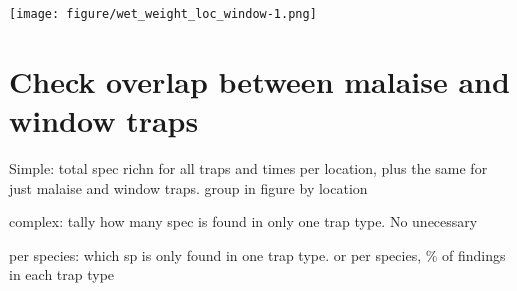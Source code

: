 \documentclass[]{article}
\newenvironment{Shaded}{\begin{snugshade}}{\end{snugshade}}
\newcommand{\DataTypeTok}[1]{\textcolor[rgb]{0.13,0.29,0.53}{#1}}
\newcommand{\DecValTok}[1]{\textcolor[rgb]{0.00,0.00,0.81}{#1}}
\newcommand{\FloatTok}[1]{\textcolor[rgb]{0.00,0.00,0.81}{#1}}
\newcommand{\KeywordTok}[1]{\textcolor[rgb]{0.13,0.29,0.53}{\textbf{#1}}}
\newcommand{\NormalTok}[1]{#1}
\newcommand{\OperatorTok}[1]{\textcolor[rgb]{0.81,0.36,0.00}{\textbf{#1}}}
\newcommand{\StringTok}[1]{\textcolor[rgb]{0.31,0.60,0.02}{#1}}
\begin{document}
\begin{Shaded}
\end{Shaded}

\texttt{[image: figure/wet\_weight\_loc\_window-1.png]}

\hypertarget{check-overlap-between-malaise-and-window-traps}{%
\section{Check overlap between malaise and window
traps}\label{check-overlap-between-malaise-and-window-traps}}

Simple: total spec richn for all traps and times per location, plus the
same for just malaise and window traps. group in figure by location

complex: tally how many spec is found in only one trap type. No
unecessary

per species: which sp is only found in one trap type. or per species, \%
of findings in each trap type
\end{document}
